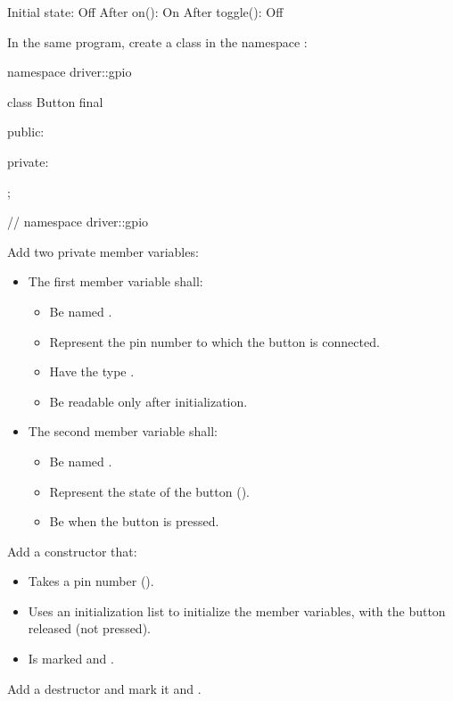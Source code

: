 \begin{console}
Initial state: Off
After on(): On
After toggle(): Off
\end{console}

\label{c2:ex:1.2}
In the same program, create a class  in the namespace :

\begin{cppcode}
namespace driver::gpio
{
class Button final
{
public:

private:
};
} // namespace driver::gpio
\end{cppcode}

\begin{parts}
  \item Add two private member variables:
  \begin{itemize}
    \item The first member variable shall:
    \begin{itemize}
      \item Be named .
      \item Represent the pin number to which the button is connected.
      \item Have the type .
      \item Be readable only after initialization.
    \end{itemize}
    \item The second member variable shall:
    \begin{itemize}
      \item Be named .
      \item Represent the state of the button ().
      \item Be  when the button is pressed.
    \end{itemize}
  \end{itemize}
  \item Add a constructor that:
  \begin{itemize}
    \item Takes a pin number ().
    \item Uses an initialization list to initialize the member variables, with the button
      released (not pressed).
    \item Is marked  and .
  \end{itemize}
  \item Add a destructor and mark it  and .

\end{parts}
